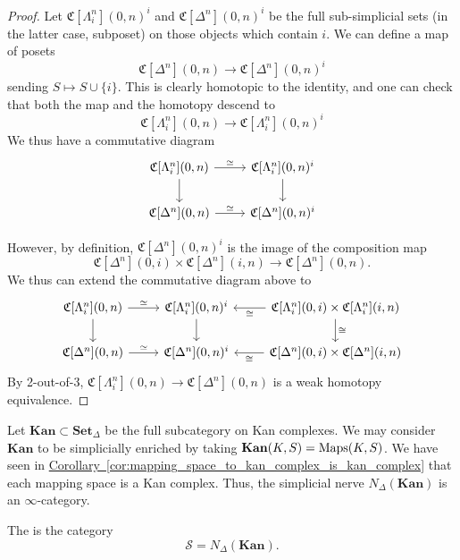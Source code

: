 \begin{proof}
	Let $\mathfrak{C}[\Lambda^n_i](0,n)^i$ and $\mathfrak{C}[\Delta^n](0,n)^i$ be the full sub-simplicial sets (in the latter case, subposet) on those objects which contain $i$. We can define a map of posets 
	\[
	\mathfrak{C}[\Delta^n](0,n)\to \mathfrak{C}[\Delta^n](0,n)^i
	\]
	sending $S\mapsto S\cup\{i\}$. This is clearly homotopic to the identity, and one can check that both the map and the homotopy descend to
	\[
	\mathfrak{C}[\Lambda^n_i](0,n)\to\mathfrak{C}[\Lambda^n_i](0,n)^i
	\]
	We thus have a commutative diagram 
	\[
	\begin{tikzcd}
	\mathfrak{C}[\Lambda^n_i](0,n)\arrow[r,"\simeq"]\arrow[d] & \mathfrak{C}[\Lambda^n_i](0,n)^i\arrow[d] \\
	\mathfrak{C}[\Delta^n](0,n)\arrow[r,"\simeq"] & \mathfrak{C}[\Delta^n](0,n)^i
	\end{tikzcd}
	\]
	
	However, by definition, $\mathfrak{C}[\Delta^n](0,n)^i$ is the image of the composition map 
	\[
	\mathfrak{C}[\Delta^n](0,i)\times \mathfrak{C}[\Delta^n](i,n)\to \mathfrak{C}[\Delta^n](0,n). 
	\]
	We thus can extend the commutative diagram above to
		\[
	\begin{tikzcd}
	\mathfrak{C}[\Lambda^n_i](0,n)\arrow[r,"\simeq"]\arrow[d] & \mathfrak{C}[\Lambda^n_i](0,n)^i\arrow[d] & \mathfrak{C}[\Lambda^n_i](0,i)\times \mathfrak{C}[\Lambda^n_i](i,n)\arrow[d,"\cong"]\arrow[l,"\cong"]\\
	\mathfrak{C}[\Delta^n](0,n)\arrow[r,"\simeq"] & \mathfrak{C}[\Delta^n](0,n)^i & \mathfrak{C}[\Delta^n](0,i)\times \mathfrak{C}[\Delta^n](i,n)\arrow[l,"\cong"]
	\end{tikzcd}
	\]
	By 2-out-of-3, $\mathfrak{C}[\Lambda^n_i](0,n)\to 	\mathfrak{C}[\Delta^n](0,n)$ is a weak homotopy equivalence.
\end{proof}

\begin{example}
	Let $\mathbf{Kan} \subset \mathbf{Set}_{\Delta}$ be the full subcategory on Kan complexes. We may consider $\mathbf{Kan}$ to be simplicially enriched by taking $\mathbf{Kan}(K, S) = \operatorname{Maps}(K, S)$. We have seen in \hyperref[cor:mapping_space_to_kan_complex_is_kan_complex]{Corollary~\ref*{cor:mapping_space_to_kan_complex_is_kan_complex}} that each mapping space is a Kan complex. Thus, the simplicial nerve $N_{\Delta}(\textbf{Kan})$ is an $\infty$-category.
\end{example}

\begin{definition}
	\label{def:category_of_spaces}
	The  is the category
	\begin{equation*}
	\mathcal{S} = N_{\Delta}(\textbf{Kan}).
	\end{equation*}
\end{definition}










